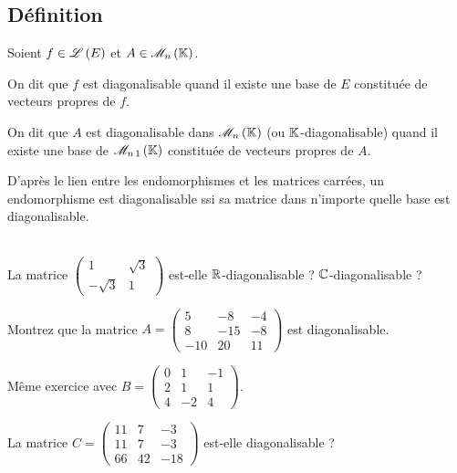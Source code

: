 \subsection{Définition}

\begin{defi}
Soient \(f\in\mathscr{L}\left(E\right)\) et \(A\in\M{n}\).

On dit que \(f\) est diagonalisable quand il existe une base de \(E\) constituée de vecteurs propres de \(f\).

On dit que \(A\) est diagonalisable dans \(\M{n}\) (ou \(\mathbb{K}\)-diagonalisable) quand il existe une base de \(\M{n\,1}\) constituée de vecteurs propres de \(A\).
\end{defi}

D'après le lien entre les endomorphismes et les matrices carrées, un endomorphisme est diagonalisable ssi sa matrice dans n'importe quelle base est diagonalisable.

\begin{exo}~\\
La matrice \(\begin{pmatrix}
1 & \sqrt{3} \\
-\sqrt{3} & 1
\end{pmatrix}\) est-elle \(\mathbb{R}\)-diagonalisable ? \(\mathbb{C}\)-diagonalisable ?
\end{exo}

\begin{exo}
Montrez que la matrice \(A=\begin{pmatrix}
5 & -8 & -4 \\
8 & -15 & -8 \\
-10 & 20 & 11
\end{pmatrix}\) est diagonalisable.
\end{exo}

\begin{exo}
Même exercice avec \(B=\begin{pmatrix}
0 & 1 & -1 \\
2 & 1 & 1 \\
4 & -2 & 4
\end{pmatrix}\).
\end{exo}

\begin{exo}
La matrice \(C=\begin{pmatrix}
11 & 7 & -3 \\
11 & 7 & -3 \\
66 & 42 & -18
\end{pmatrix}\) est-elle diagonalisable ?
\end{exo}

